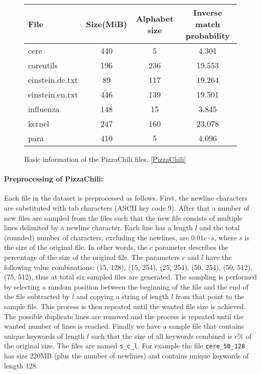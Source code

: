 \documentclass[english,twoside,censored,csm,algorithms-track-2020]{HYthesisML}
\theoremstyle{plain}
\theoremstyle{definition}
\begin{document}
\begin{figure}
\begin{center}
  \begin{tabular}{|l|c|c|c|}
    \hline
    \textbf{File} & \textbf{Size(MiB)} & \textbf{Alphabet size} & \textbf{Inverse match probability} \\
    \hline
    cere & 440 & 5 & 4.301 \\
    coreutils & 196 & 236 & 19.553 \\
    einstein.de.txt & 89 & 117 & 19.264 \\
    einstein.en.txt & 446 & 139 & 19.501 \\
    influenza & 148 & 15 & 3.845 \\
    kernel & 247 & 160 & 23.078 \\
    para & 410 & 5 & 4.096\\
    \hline
  \end{tabular}
  \caption{Basic information of the PizzaChili files. \ref{PizzaChili}}
\end{center}
\end{figure}


\paragraph{Preprocessing of PizzaChili:}
Each file in the dataset is preprocessed as follows. First, the newline characters are substituted
with tab characters (ASCII key code 9). After that a number of new files are sampled from the files
such that the new file consists of multiple lines delimited by a newline character. Each line has a
length $l$ and the total (rounded) number of characters, excluding the newlines, are $0.01c\cdot s$,
where $s$ is the size of the original file. In other words, the $c$ parameter describes the percentage
of the size of the original file. The parameters $c$ and $l$ have the following value
combinations: (15, 128), (15, 254), (25, 254), (50, 254), (50, 512), (75, 512), thus at total six
sampled files are generated. The sampling is performed by selecting a random position between
the beginning of the file and the end of the file subtracted by $l$ and copying a string of length
$l$ from that point to the sample file. This process is then repeated until the wanted file size is
achieved. The possible duplicate lines are removed and the process is repeated until the wanted
number of lines is reached. Finally we have a sample file that contains unique keywords of length
$l$ such that the size of all keywords combined is $c\%$ of the original size. The files are
named \texttt{s\_c\_l}. For example the file \texttt{cere\_50\_128} has size 220MB
(plus the number of newlines) and contains unique keywords of length 128.
\end{document}
